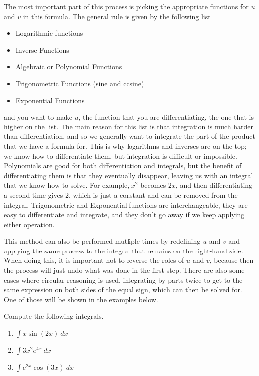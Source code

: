The most important part of this process is picking the appropriate functions for $u$ and $v$ in this formula. The general rule is given by the following list
\begin{itemize}
\item Logarithmic functions
\item Inverse Functions
\item Algebraic or Polynomial Functions
\item Trigonometric Functions (sine and cosine)
\item Exponential Functions
\end{itemize}
and you want to make $u$, the function that you are differentiating, the one that is higher on the list. The main reason for this list is that integration is much harder than differentiation, and so we generally want to integrate the part of the product that we have a formula for. This is why logarithms and inverses are on the top; we know how to differentiate them, but integration is difficult or impossible. Polynomials are good for both differentiation and integrals, but the benefit of differentiating them is that they eventually disappear, leaving us with an integral that we know how to solve. For example, $x^2$ becomes $2x$, and then differentiating a second time gives $2$, which is just a constant and can be removed from the integral. Trigonometric and Exponential functions are interchangeable, they are easy to differentiate and integrate, and they don't go away if we keep applying either operation.

This method can also be performed mutliple times by redefining $u$ and $v$ and applying the same process to the integral that remains on the right-hand side. When doing this, it is important not to reverse the roles of $u$ and $v$, because then the process will just undo what was done in the first step. There are also some cases where circular reasoning is used, integrating by parts twice to get to the same expression on both sides of the equal sign, which can then be solved for. One of those will be shown in the examples below.

\begin{example}
Compute the following integrals.
\begin{enumerate}
\item $\int x\sin(2x)\ dx$
\item $\int 3x^2e^{4x}\ dx$
\item $\int e^{2x}\cos(3x)\ dx$
\end{enumerate}
\end{example}

